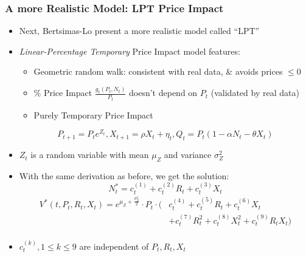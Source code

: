\documentclass[handout]{beamer}
\begin{document}
\begin{frame}
\frametitle{A more Realistic Model: LPT Price Impact}
\pause
\begin{itemize}
\pause
\item Next, Bertsimas-Lo present a more realistic model called ``LPT''
\pause
\item {\em Linear-Percentage Temporary} Price Impact model features:
\pause
\begin{itemize}
\item Geometric random walk: consistent with real data, \& avoids prices $\leq 0$
\pause
\item \% Price Impact $\frac {g_t(P_t,N_t)} {P_t}$ doesn't depend on $P_t$ (validated by real data)
\pause
\item Purely Temporary Price Impact
\pause
\end{itemize}
$$P_{t+1} = P_t e^{Z_t},  X_{t+1} = \rho X_t + \eta_t, Q_t = P_t(1 - \alpha N_t - \theta X_t)$$
\pause
\item $Z_t$ is a random variable with mean $\mu_Z$ and variance $\sigma^2_Z$
\pause
\item With the same derivation as before, we get the solution:
$$N_t^* = c^{(1)}_t + c^{(2)}_t R_t + c^{(3)}_t X_t $$
\pause
\begin{align*}
V^*(t,P_t,R_t,X_t) = e^{\mu_Z + \frac {\sigma_Z^2} 2} \cdot P_t \cdot ( & c^{(4)}_t + c^{(5)}_t R_t + c^{(6)}_t X_t \\
& + c^{(7)}_t R_t^2 + c^{(8)}_t X_t^2 + c^{(9)}_t R_t X_t)\\
\end{align*}
\pause
\item $c^{(k)}_t, 1 \leq k \leq 9$ are independent of $P_t, R_t, X_t$
\end{itemize}
\end{frame}
\end{document}
